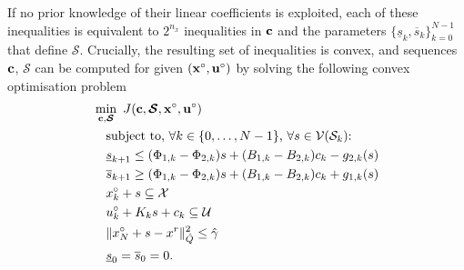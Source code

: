 \documentclass[a4paper, 10 pt, conference]{IEEEconf}
\def\S{\mathcal{S}}
\def\V{\mathcal{V}}
\def\U{\mathcal{U}}
\def\X{\mathcal{X}}
\def\bc{{\bf c}}
\def\bS{\boldsymbol{\mathcal{S}}}
\begin{document}
%
If no prior knowledge of their linear coefficients is exploited, each of these inequalities is equivalent to $2^{n_x}$ inequalities in $\bc$ and the parameters $\{\underline{s}_k,\overline{s}_k\}_{k=0}^{N-1}$ that define $\bS$. Crucially, the resulting set of inequalities is convex, and sequences $\bc$, $\bS$ can be computed for given $({\bf x}^\circ,{\bf u}^\circ)$ by solving the following convex optimisation problem
\begin{equation}\label{eq:cvx}
\begin{aligned}
& \min_{\bc,\bS} \ J(\bc,\bS,{\bf x}^\circ,{\bf u}^\circ) 
\\
& \quad \text{subject to, $\forall k \in \{0, \ldots, N-1\}$, $\forall s\in\V(\S_k)$:}
\\ 
& \quad \underline{s}_{k+1} \leq (\Phi_{1, k}-\Phi_{2, k}) s + (B_{1, k}-B_{2, k}) c_k - g_{2,k}(s)
\\
%
& \quad \overline{s}_{k+1} \geq (\Phi_{1, k}-\Phi_{2, k}) s + (B_{1, k}-B_{2, k}) c_k + g_{1, k}(s) 
\\
& \quad x_k^\circ+s \subseteq \X \, 
\\
& \quad u_k^\circ+ K_k s + c_k \subseteq \U
\\
& \quad \lVert x_N^\circ +s - x^r \rVert_{\hat{Q}}^2 \leq \hat{\gamma}
\\
& \quad \underline{s}_0=\overline{s}_0 = 0.
\end{aligned}
\end{equation}
\end{document}

